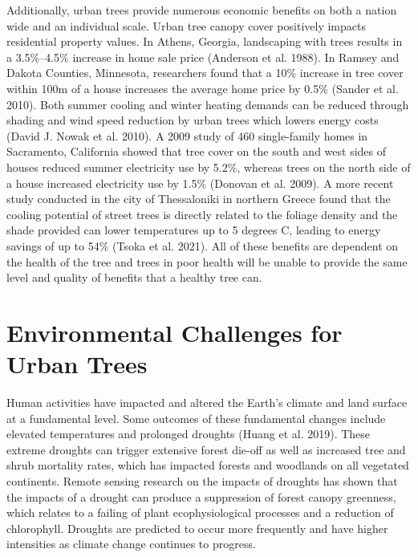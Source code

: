 \documentclass[12pt,twoside]{reedthesis}
\begin{document}
Additionally, urban trees provide numerous economic benefits on both a
nation wide and an individual scale. Urban tree canopy cover positively
impacts residential property values. In Athens, Georgia, landscaping
with trees results in a 3.5\%--4.5\% increase in home sale price
(Anderson et al. 1988). In Ramsey and Dakota Counties, Minnesota, researchers
found that a 10\% increase in tree cover within 100m of a house increases
the average home price by 0.5\% (Sander et al. 2010). Both summer cooling and
winter heating demands can be reduced through shading and wind speed
reduction by urban trees which lowers energy costs (David J. Nowak et al. 2010). A 2009
study of 460 single-family homes in Sacramento, California showed that
tree cover on the south and west sides of houses reduced summer
electricity use by 5.2\%, whereas trees on the north side of a house
increased electricity use by 1.5\% (Donovan et al. 2009). A more recent study
conducted in the city of Thessaloniki in northern Greece found that the
cooling potential of street trees is directly related to the foliage
density and the shade provided can lower temperatures up to 5 degrees C,
leading to energy savings of up to 54\% (Tsoka et al. 2021). All of these
benefits are dependent on the health of the tree and trees in poor
health will be unable to provide the same level and quality of benefits
that a healthy tree can.

\hypertarget{environmental-challenges-for-urban-trees}{%
\section{Environmental Challenges for Urban Trees}\label{environmental-challenges-for-urban-trees}}

Human activities have impacted and altered the Earth's climate and land
surface at a fundamental level. Some outcomes of these fundamental
changes include elevated temperatures and prolonged droughts
(Huang et al. 2019). These extreme droughts can trigger extensive forest
die-off as well as increased tree and shrub mortality rates, which has
impacted forests and woodlands on all vegetated continents. Remote
sensing research on the impacts of droughts has shown that the impacts
of a drought can produce a suppression of forest canopy greenness, which
relates to a failing of plant ecophysiological processes and a reduction
of chlorophyll. Droughts are predicted to occur more frequently and have
higher intensities as climate change continues to progress.
\end{document}
